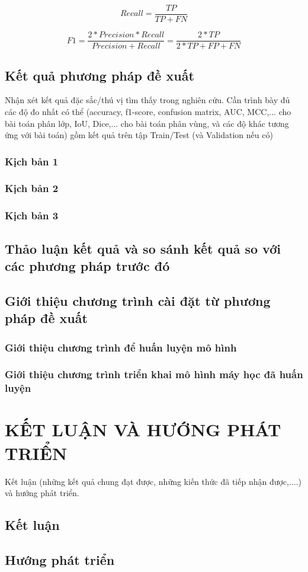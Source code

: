 \begin{equation}
Recall = \frac{TP}{TP+FN}
\end{equation}

\begin{equation}
F1 = \frac{2*Precision*Recall}{Precision+Recall} = \frac{2*TP}{2*TP+FP+FN}
\end{equation}
\section{Kết quả phương pháp đề xuất}
Nhận xét kết quả đặc sắc/thú vị tìm thấy trong nghiên cứu. Cần trình bày đủ các độ đo nhất có thể (accuracy, f1-score, confusion matrix, AUC, MCC,... cho bài toán phân lớp, IoU, Dice,... cho bài toán phân vùng, và các độ khác tương ứng với bài toán) gồm kết quả trên tập Train/Test (và Validation nếu có)

\subsection{Kịch bản 1}
\subsection{Kịch bản 2}
\subsection{Kịch bản 3}
\section{Thảo luận kết quả và so sánh kết quả so với các phương pháp trước đó}
\section{Giới thiệu chương trình cài đặt từ phương pháp đề xuất}
\subsection{Giới thiệu chương trình để huấn luyện mô hình}

\subsection{Giới thiệu chương trình triển khai mô hình máy học đã huấn luyện}

\chapter{KẾT LUẬN VÀ HƯỚNG PHÁT TRIỂN}
\startcontents[chapters]
Kết luận (những kết quả chung đạt được, những kiến thức đã tiếp nhận được,....) và hướng phát triển.
\section{Kết luận}
\section{Hướng phát triển}

